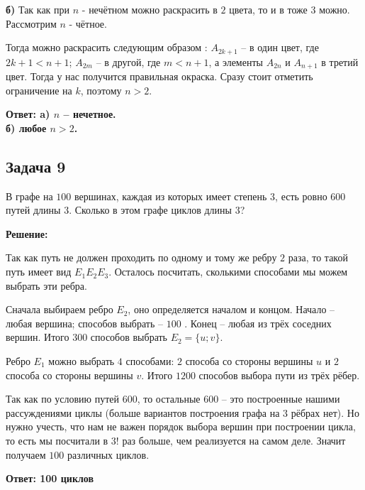 \documentclass[a4paper,14pt]{article} %
\begin{document}
{\bf б)} Так как при $n$ - нечётном можно раскрасить в $2$ цвета, то и в тоже $3$ можно. Рассмотрим $n$ - чётное.

Тогда можно раскрасить следующим образом : $A_{2k+1}$ -- в один цвет, где $2k+1 < n+1$; $A_{2m}$ -- в другой, где $m < n+1$, а элементы $A_{2n}$ и $A_{n+1}$ в третий цвет. Тогда у нас получится правильная окраска. Сразу стоит отметить ограничение на $k$, поэтому $n > 2$. 

\begin{flushright}
\begin{large}
\textbf {Ответ: {\bf a)} $n$ -- нечетное.\\
{\bf б)} любое $n > 2$.}
\end{large}
\end{flushright}


\begin{center}
\subsection{Задача 9}
\end{center}

 В графе на $100$ вершинах, каждая из которых имеет степень $3$, есть
ровно $600$ путей длины $3$. Сколько в этом графе циклов длины $3$?
\begin{center}
\bfseries
{\Large Решение: }
\end{center}

Так как путь не должен проходить по одному и тому же ребру $2$ раза, то такой путь имеет вид $E_1E_2E_3$. Осталось посчитать, сколькими способами мы можем выбрать эти ребра.

Сначала выбираем ребро $E_2$, оно определяется началом и концом. Начало -- любая вершина; способов выбрать -- $100$ . Конец -- любая из трёх соседних вершин. Итого $300$ способов выбрать $E_2 = \{ u ; v\}$.

Ребро $E_1$ можно выбрать $4$ способами: $2$ способа со стороны вершины $u$ и $2$ способа со стороны вершины $v$. Итого $1200$ способов выбора пути из трёх рёбер.

Так как по условию путей $600$, то остальные $600$ -- это построенные нашими рассуждениями циклы (больше вариантов построения графа на $3$ рёбрах нет). Но нужно учесть, что нам не важен порядок выбора вершин при построении цикла, то есть мы посчитали в $3!$ раз больше, чем реализуется на самом деле. Значит получаем $100$ различных циклов.


\begin{flushright}
\begin{large}
\textbf {Ответ: 100 циклов }
\end{large}
\end{flushright}
\end{document}
